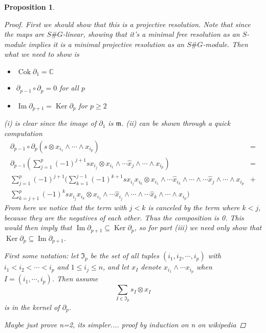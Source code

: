 \documentclass[11pt, a4paper, english]{article}
\newtheorem{prop}{Proposition}
\numberwithin{prop}{section}
\numberwithin{lemma}{section}
\numberwithin{theorem}{section}
\numberwithin{defin}{section}
\numberwithin{example}{section}
\newcommand{\C}{\mathbb{C}}
\DeclareMathOperator{\Image}{Im}
\DeclareMathOperator{\Ker}{Ker}
\DeclareMathOperator{\Cok}{Cok}
\begin{document}
\begin{prop}
\begin{proof}
First we should show that this is a projective resolution. Note that since the maps are $S\#G$-linear, showing that it's a minimal free resolution as an $S$-module implies it is a minimal projective resolution as an $S\#G$-module. Then what we need to show is 
\begin{itemize}
\item[(i)] $\Cok \partial_1 = \C$
\item[(ii)] $\partial_{p-1} \circ \partial_{p} = 0$ for all $p$
\item[(iii)] $\Image \partial_{p+1} = \Ker \partial_p$ for $p \geq 2$
\end{itemize}
(i) is clear since the image of $\partial_1$ is $\mathfrak{m}$. (ii) can be shown through a quick computation
\begin{align*}
\partial_{p-1} \circ \partial_{p}(s \otimes x_{i_1} \wedge \cdots \wedge x_{i_p}) &=\\ 
\partial_{p-1} \left(\sum_{j=1}^p (-1)^{j+1} sx_{i_j} \otimes x_{i_1} \wedge \cdots \hat{x}_j \wedge \cdots \wedge x_{i_p} \right)&=\\
\sum_{j=1}^p (-1)^{j+1} \Bigg(\sum_{k=1}^{j-1} (-1)^{k+1} sx_{i_j}x_{i_k} \otimes x_{i_1}\wedge \cdots \hat{x}_{i_k} \wedge \cdots \wedge \cdots \hat{x}_j \wedge \cdots \wedge x_{i_p}& +\\
\sum_{k=j+1}^{p} (-1)^k sx_{i_j}x_{i_k} \otimes x_{i_1}\wedge \cdots \hat{x}_{i_j} \wedge \cdots \wedge \cdots \hat{x}_k \wedge \cdots \wedge x_{i_p}\Bigg) &
\end{align*}
From here we notice that the term with $j < k$ is canceled by the term where $k < j$, because they are the negatives of each other. Thus the composition is 0. This would then imply that $\Image \partial_{p+1} \subseteq \Ker \partial_p$, so for part (iii) we need only show that $\Ker \partial_p \subseteq \Image \partial_{p+1}$.

First some notation: let $\mathfrak{I}_p$ be the set of all tuples $(i_1, i_2, \cdots, i_p)$ with $i_1 < i_2 < \cdots < i_p$ and $1 \leq i_j \leq n$, and let $x_I$ denote $x_{i_1} \wedge \cdots x_{i_p}$ when $I=(i_1, \cdots, i_p)$. Then assume $$ \sum_{I \in \mathfrak{I}_p} s_I \otimes x_I$$ is in the kernel of $\partial_p$. 


Maybe just prove n=2, its simpler....
proof by induction on n on wikipedia %


\end{proof}
\end{prop}
\end{document}
